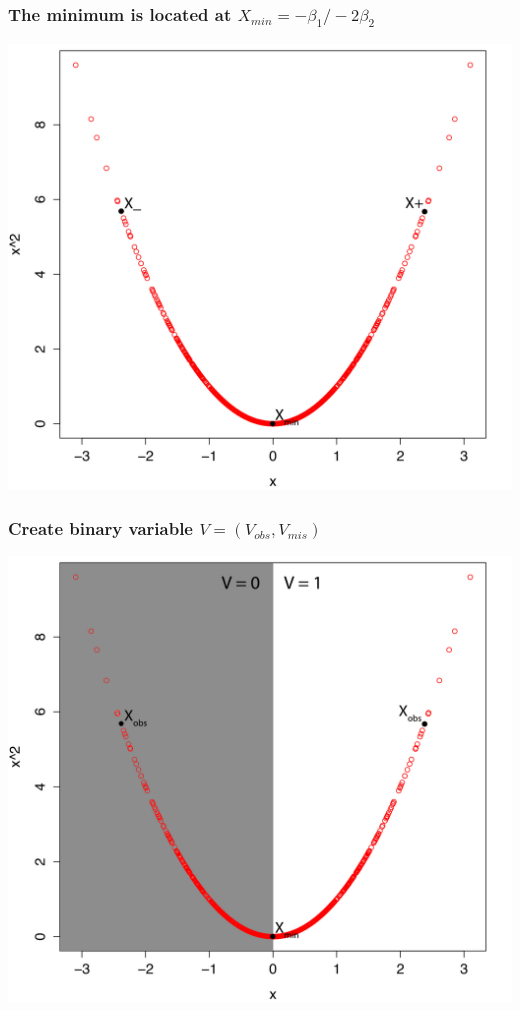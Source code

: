 \documentclass{beamer}
\begin{document}
\begin{frame}
  \frametitle{The minimum is located at $X_{min} =  -\beta_1/-2\beta_2$}
  \vspace{-.05 in} %
  \centering
\includegraphics[scale=.45]{ChooseV.pdf}
 \end{frame}
 
\begin{frame}
  \frametitle{Create binary variable $V = (V_{obs}, V_{mis})$}
  \vspace{-.05 in} %
  \centering
\includegraphics[scale=.45]{ChooseV2.pdf}
 \end{frame}
 
\end{document}
